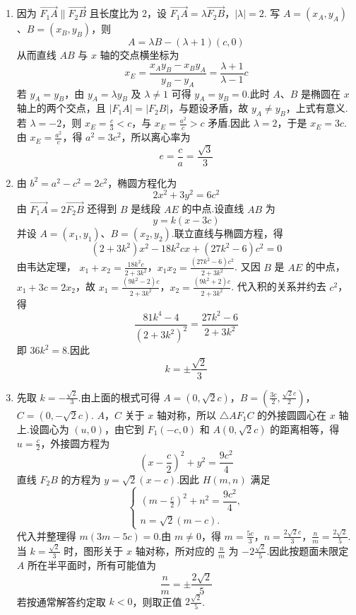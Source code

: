\begin{solution}
\begin{enumerate}
\item 因为 \(\overrightarrow{F_1A}\parallel\overrightarrow{F_2B}\) 且长度比为 \(2\)，设
\(\overrightarrow{F_1A}=\lambda\overrightarrow{F_2B}\)，\(|\lambda|=2\).
写 \(A=(x_A,y_A)\)、\(B=(x_B,y_B)\)，则
\[
A=\lambda B-(\lambda+1)(c,0)
\]
从而直线 \(AB\) 与 \(x\) 轴的交点横坐标为
\[
x_E=\frac{x_Ay_B-x_By_A}{y_B-y_A}=\frac{\lambda+1}{\lambda-1}c
\]
若 \(y_A=y_B\)，由 \(y_A=\lambda y_B\) 及 \(\lambda\ne1\) 可得 \(y_A=y_B=0\).此时 \(A\)、\(B\) 是椭圆在 \(x\) 轴上的两个交点，且 \(\lvert F_1A\rvert=\lvert F_2B\rvert\)，与题设矛盾，故 \(y_A\ne y_B\)，上式有意义.若 \(\lambda=-2\)，则 \(x_E=\frac{c}{3}<c\)，与 \(x_E=\frac{a^2}{c}>c\) 矛盾.因此 \(\lambda=2\)，于是 \(x_E=3c\).由 \(x_E=\frac{a^2}{c}\)，得 \(a^2=3c^2\)，所以离心率为
\[
e=\frac ca=\frac{\sqrt3}{3}
\]

\item 由 \(b^2=a^2-c^2=2c^2\)，椭圆方程化为
\[
2x^2+3y^2=6c^2
\]
由 \(\overrightarrow{F_1A}=2\overrightarrow{F_2B}\) 还得到 \(B\) 是线段 \(AE\) 的中点.设直线 \(AB\) 为
\[
y=k(x-3c)
\]
并设 \(A=(x_1,y_1)\)、\(B=(x_2,y_2)\).联立直线与椭圆方程，得
\[
(2+3k^2)x^2-18k^2cx+(27k^2-6)c^2=0
\]
由韦达定理，
\(x_1+x_2=\frac{18k^2c}{2+3k^2}\)，\(x_1x_2=\frac{(27k^2-6)c^2}{2+3k^2}\).
又因 \(B\) 是 \(AE\) 的中点，\(x_1+3c=2x_2\)，故
\(x_1=\frac{(9k^2-2)c}{2+3k^2}\)，\(x_2=\frac{(9k^2+2)c}{2+3k^2}\).
代入积的关系并约去 \(c^2\)，得
\[
\frac{81k^4-4}{(2+3k^2)^2}=\frac{27k^2-6}{2+3k^2}
\]
即 \(36k^2=8\).因此
\[
k=\pm\frac{\sqrt2}{3}
\]

\item 先取 \(k=-\frac{\sqrt2}{3}\).由上面的根式可得
\(A=(0,\sqrt2c)\)，\(B=\left(\frac{3c}{2},\frac{\sqrt2c}{2}\right)\)，\(C=(0,-\sqrt2c)\).
\(A\)，\(C\) 关于 \(x\) 轴对称，所以 \(\triangle AF_1C\) 的外接圆圆心在 \(x\) 轴上.设圆心为 \((u,0)\)，由它到 \(F_1(-c,0)\) 和 \(A(0,\sqrt2c)\) 的距离相等，得 \(u=\frac{c}{2}\)，外接圆方程为
\[
\left(x-\frac c2\right)^2+y^2=\frac{9c^2}{4}
\]
直线 \(F_2B\) 的方程为 \(y=\sqrt2(x-c)\).因此 \(H(m,n)\) 满足
\[
\begin{cases}
\left(m-\frac c2\right)^2+n^2=\dfrac{9c^2}{4},\\
n=\sqrt2(m-c).
\end{cases}
\]
代入并整理得 \(m(3m-5c)=0\).由 \(m\ne0\)，得
\(m=\frac{5c}{3}\)，\(n=\frac{2\sqrt2c}{3}\)，\(\frac nm=\frac{2\sqrt2}{5}\).
当 \(k=\frac{\sqrt2}{3}\) 时，图形关于 \(x\) 轴对称，所对应的 \(\frac{n}{m}\) 为 \(-2\frac{\sqrt2}{5}\).因此按题面未限定 \(A\) 所在半平面时，所有可能值为
\[
\frac nm=\pm\frac{2\sqrt2}{5}
\]
若按通常解答约定取 \(k<0\)，则取正值 \(2\frac{\sqrt2}{5}\).
\end{enumerate}
\end{solution}
